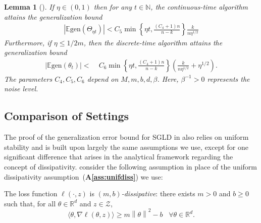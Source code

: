 \documentclass{article}
\newcommand{\norm}[1]{\left\lVert#1\right\rVert} %
\newtheorem{lemma}{Lemma}
\newenvironment{customass}[1]
{\renewcommand\theinnercustomass{#1}\innercustomass}
{\endinnercustomass}
\begin{document}
\begin{lemma}[{\cite[Theorem 4.1]{Farghly}}]\label{lemma:sgld}
    If $\eta \in (0,1) $ then for any $t \in \mathbb{N}$, the {continuous-time algorithm} attains the {generalization bound}
    \begin{align*}
        |\mathbb{E} \mathrm{gen}(\Theta_{\eta t})| < C_5 \min \left\{\eta t, \frac{(C_4 + 1)n}{n-k}\right\} \frac{k}{n \eta^{1/2}}
    \end{align*}
    Furthermore, if $\eta \leq 1/2m$, then the {discrete-time algorithm attains the generalization bound}
    \begin{align*}
        |\mathbb{E} \mathrm{gen}(\theta_t)| <&\; C_6  \min \left\{\eta t, \frac{(C_4 + 1)n}{n-k}\right\} \left(\frac{k}{n \eta^{1/2}} + \eta^{1/2}\right).
    \end{align*}
    The parameters $C_4, C_5, C_6$  depend on $M, m, b, d, \beta$. Here, $\beta^{-1} > 0$ represents the noise level.
\end{lemma}

\subsection{Comparison of Settings}\label{sec:comparisonSetting}
The proof of the generalization error bound for SGLD in \citet{Farghly} also relies on uniform stability and is built upon largely the same assumptions we use, except for one significant difference that arises in the analytical framework regarding the concept of dissipativity. \citet{Farghly} consider the following assumption in place of the uniform dissipativity assumption~(\textbf{A\ref{ass:unifdiss}}) we use:

\begin{customass}{1$^\prime$}[\textbf{A1$^\prime$}]\label{ass:diss}
    The loss function $\ell(\cdot, z)$ is \textit{$(m,b)$-dissipative}: there exists $m>0$ and $b \geq 0$ such that, for all $\theta \in \mathbb{R}^d$ and $z \in \mathcal{Z}$,
    $$\langle \theta, \nabla \ell(\theta, z)\rangle \geq m\norm{\theta}^2 - b \;\;\; \forall \theta \in \mathbb{R}^d.$$
\end{customass} 
\end{document}
